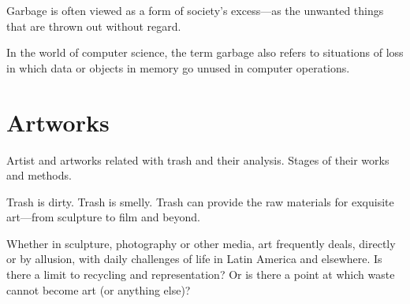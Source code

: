 \documentclass[12pt]{article}
\begin{document}
Garbage is often viewed as a form of society’s excess---as the unwanted things that are thrown out without regard. 

In the world of computer science, the term garbage also refers to situations of loss in which data or objects in memory go unused in computer operations.

\section{Artworks}
Artist and artworks related with trash and their analysis. Stages of their works and methods.

Trash is dirty. Trash is smelly. Trash can provide the raw materials for exquisite art---from sculpture to film and beyond.

Whether in sculpture, photography or other media, art frequently deals, directly or by allusion, with daily challenges of life in Latin America and elsewhere. Is there a limit to recycling and representation? Or is there a point at which waste cannot become art (or anything else)?
\end{document}
